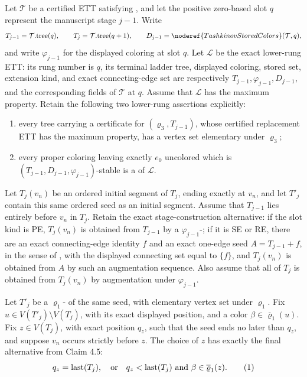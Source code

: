 \begin{lemma}
Let \(\mathcal T\) be a certified ETT satisfying
, and let the positive zero-based slot
\(q\) represent the manuscript stage \(j-1\).  Write
\[
 T_{j-1}=\mathcal T.\mathrm{tree}(q),\qquad
 T_j=\mathcal T.\mathrm{tree}(q+1),\qquad
 D_{j-1}=\noderef{TashkinovStoredColors}(\mathcal T,q),
\]
and write \(\varphi_{j-1}\) for the displayed coloring at slot \(q\).
Let \(\mathcal L\) be the exact lower-rung ETT: its rung number is
\(q\), its terminal ladder tree, displayed coloring, stored set,
extension kind, and exact connecting-edge set are respectively
\(T_{j-1},\varphi_{j-1},D_{j-1}\), and the corresponding fields of
\(\mathcal T\) at \(q\).  Assume that \(\mathcal L\) has the maximum
property.  Retain the following two lower-rung assertions explicitly:
\begin{enumerate}
\item[(i)] every tree carrying a
   certificate for
  \((\varrho_3,T_{j-1})\), whose certified replacement ETT has the
  maximum property, has a vertex set elementary under \(\varrho_3\);
\item[(vi)] every proper coloring leaving exactly \(e_0\) uncolored
  which is \((T_{j-1},D_{j-1},\varphi_{j-1})\)-stable is a
   of \(\mathcal L\).
\end{enumerate}

Let \(T_j(v_n)\) be an ordered initial segment of \(T_j\), ending
exactly at \(v_n\), and let \(T'_j\) contain this same ordered seed as
an initial segment.  Assume that \(T_{j-1}\) lies entirely before
\(v_n\) in \(T_j\).  Retain the exact stage-construction alternative:
if the slot kind is PE, \(T_j(v_n)\) is obtained from \(T_{j-1}\) by a
\(\varphi_{j-1}\)-; if it is SE
or RE, there are an exact connecting-edge identity \(f\) and an exact
one-edge seed \(A=T_{j-1}+f\), in the sense of
, with the displayed connecting set
equal to \(\{f\}\), and \(T_j(v_n)\) is obtained from \(A\) by such an
augmentation sequence.  Also assume that all of \(T_j\) is obtained
from \(T_j(v_n)\) by augmentation under \(\varphi_{j-1}\).

Let \(T'_j\) be a \(\varrho_1\)- of the same
seed, with elementary vertex set under \(\varrho_1\).  Fix
\(u\in V(T'_j)\setminus V(T_j)\), with its exact displayed position,
and a color
\(\beta\in\overline{\varrho}_1(u)\).  Fix
\(z\in V(T_j)\), with exact position \(q_z\), such that the seed ends
no later than \(q_z\), and suppose \(v_n\) occurs strictly before
\(z\).  The choice of \(z\) has exactly the final alternative from
Claim 4.5:
\[
 q_z=\operatorname{last}(T_j),
 \quad\hbox{or}\quad
 q_z<\operatorname{last}(T_j)
       \text{ and }\beta\in\overline{\varrho}_1(z).          \tag{1}
\]


\end{lemma}
